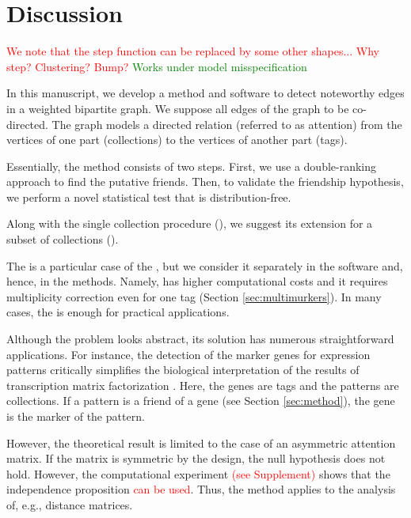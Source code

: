 \documentclass{llncs}
\begin{document}
\section{Discussion}
\label{sec:discussion}

\textcolor{red}{We note that the step function can be replaced by some other shapes... Why step? Clustering? Bump?}
\textcolor{green}{Works under model misspecification}

In this manuscript, we develop a method and software to detect noteworthy edges in a weighted bipartite graph. We suppose all edges of the graph to be co-directed. The graph models a directed relation (referred to as attention) from the vertices of one part (collections) to the vertices of another part (tags).

Essentially, the method consists of two steps. First, we use a double-ranking approach to find the putative friends. Then, to validate the friendship hypothesis, we perform a novel statistical test that is distribution-free.

Along with the single collection procedure (), we suggest its extension for a subset of collections ().

The  is a particular case of the , but we consider it separately in the software and, hence, in the methods. Namely,  has higher computational costs and it requires multiplicity correction even for one tag (Section \ref{sec:multimurkers}). In many cases, the  is enough for practical applications. 

Although the problem looks abstract, its solution has numerous straightforward applications. For instance, the detection of the marker genes \cite{stein-obrien_patternmarkers_2017} for expression patterns critically simplifies the biological interpretation of the results of transcription matrix factorization \cite{Stein_2018,Fertig_2016}. Here, the genes are tags and the patterns are collections. If a pattern is a friend of a gene (see Section \ref{sec:method}), the gene is the marker of the pattern.

However, the theoretical result is limited to the case of an asymmetric attention matrix. If the matrix is symmetric by the design, the null hypothesis does not hold. However, the computational experiment \textcolor{red}{(see Supplement)} shows that the independence proposition \textcolor{red}{can be used}. Thus, the method applies to the analysis of, e.g., distance matrices. 
\end{document}

